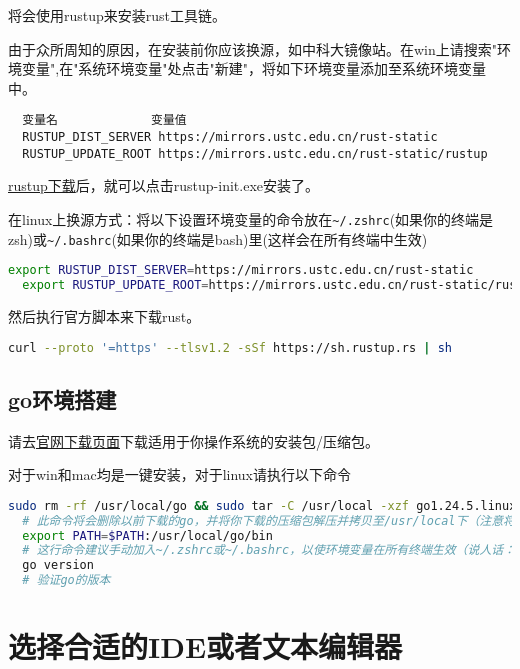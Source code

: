 \documentclass[../main.tex]{subfiles}
\begin{document}
将会使用rustup来安装rust工具链。

由于众所周知的原因，在安装前你应该换源，如中科大镜像站。在win上请搜索"环境变量",在"系统环境变量"处点击"新建"，将如下环境变量添加至系统环境变量中。

\begin{lstlisting}
  变量名             变量值
  RUSTUP_DIST_SERVER https://mirrors.ustc.edu.cn/rust-static
  RUSTUP_UPDATE_ROOT https://mirrors.ustc.edu.cn/rust-static/rustup
\end{lstlisting}

\href{https://rustup.rs/#}{rustup下载}后，就可以点击rustup-init.exe安装了。

在linux上换源方式：将以下设置环境变量的命令放在\texttt{\textasciitilde/.zshrc}(如果你的终端是zsh)或\texttt{\textasciitilde/.bashrc}(如果你的终端是bash)里(这样会在所有终端中生效)

\begin{lstlisting}[language=bash]
  export RUSTUP_DIST_SERVER=https://mirrors.ustc.edu.cn/rust-static
  export RUSTUP_UPDATE_ROOT=https://mirrors.ustc.edu.cn/rust-static/rustup
\end{lstlisting}

然后执行官方脚本来下载rust。

\begin{lstlisting}[language=bash]
  curl --proto '=https' --tlsv1.2 -sSf https://sh.rustup.rs | sh
\end{lstlisting}

\subsection{go环境搭建}

请去\href{https://go.dev/doc/install}{官网下载页面}下载适用于你操作系统的安装包/压缩包。

对于win和mac均是一键安装，对于linux请执行以下命令

\begin{lstlisting}[language=bash]
  sudo rm -rf /usr/local/go && sudo tar -C /usr/local -xzf go1.24.5.linux-amd64.tar.gz
  # 此命令将会删除以前下载的go，并将你下载的压缩包解压并拷贝至/usr/local下（注意将其替换为压缩包的真实路径）
  export PATH=$PATH:/usr/local/go/bin
  # 这行命令建议手动加入~/.zshrc或~/.bashrc，以使环境变量在所有终端生效（说人话：让终端能找到你的go在哪）
  go version
  # 验证go的版本
\end{lstlisting}

\section{选择合适的IDE或者文本编辑器}
\end{document}
